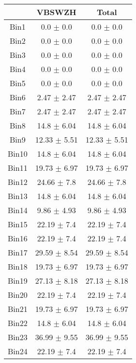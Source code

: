   \begin{tabular}{|c|c|c|}
  \hline
      & VBSWZH & Total \\ \cline{1-3} 
     \hline\hline
     Bin1 & 0.0 $\pm$ 0.0 & 0.0 $\pm$ 0.0 \\ \cline{1-3} 
     Bin2 & 0.0 $\pm$ 0.0 & 0.0 $\pm$ 0.0 \\ \cline{1-3} 
     Bin3 & 0.0 $\pm$ 0.0 & 0.0 $\pm$ 0.0 \\ \cline{1-3} 
     Bin4 & 0.0 $\pm$ 0.0 & 0.0 $\pm$ 0.0 \\ \cline{1-3} 
     Bin5 & 0.0 $\pm$ 0.0 & 0.0 $\pm$ 0.0 \\ \cline{1-3} 
     Bin6 & 2.47 $\pm$ 2.47 & 2.47 $\pm$ 2.47 \\ \cline{1-3} 
     Bin7 & 2.47 $\pm$ 2.47 & 2.47 $\pm$ 2.47 \\ \cline{1-3} 
     Bin8 & 14.8 $\pm$ 6.04 & 14.8 $\pm$ 6.04 \\ \cline{1-3} 
     Bin9 & 12.33 $\pm$ 5.51 & 12.33 $\pm$ 5.51 \\ \cline{1-3} 
     Bin10 & 14.8 $\pm$ 6.04 & 14.8 $\pm$ 6.04 \\ \cline{1-3} 
     Bin11 & 19.73 $\pm$ 6.97 & 19.73 $\pm$ 6.97 \\ \cline{1-3} 
     Bin12 & 24.66 $\pm$ 7.8 & 24.66 $\pm$ 7.8 \\ \cline{1-3} 
     Bin13 & 14.8 $\pm$ 6.04 & 14.8 $\pm$ 6.04 \\ \cline{1-3} 
     Bin14 & 9.86 $\pm$ 4.93 & 9.86 $\pm$ 4.93 \\ \cline{1-3} 
     Bin15 & 22.19 $\pm$ 7.4 & 22.19 $\pm$ 7.4 \\ \cline{1-3} 
     Bin16 & 22.19 $\pm$ 7.4 & 22.19 $\pm$ 7.4 \\ \cline{1-3} 
     Bin17 & 29.59 $\pm$ 8.54 & 29.59 $\pm$ 8.54 \\ \cline{1-3} 
     Bin18 & 19.73 $\pm$ 6.97 & 19.73 $\pm$ 6.97 \\ \cline{1-3} 
     Bin19 & 27.13 $\pm$ 8.18 & 27.13 $\pm$ 8.18 \\ \cline{1-3} 
     Bin20 & 22.19 $\pm$ 7.4 & 22.19 $\pm$ 7.4 \\ \cline{1-3} 
     Bin21 & 19.73 $\pm$ 6.97 & 19.73 $\pm$ 6.97 \\ \cline{1-3} 
     Bin22 & 14.8 $\pm$ 6.04 & 14.8 $\pm$ 6.04 \\ \cline{1-3} 
     Bin23 & 36.99 $\pm$ 9.55 & 36.99 $\pm$ 9.55 \\ \cline{1-3} 
     Bin24 & 22.19 $\pm$ 7.4 & 22.19 $\pm$ 7.4 \\ \cline{1-3} 

\end{tabular}
